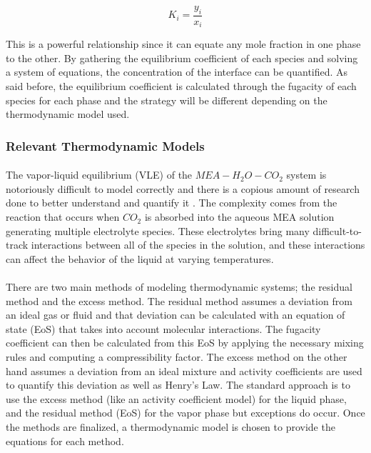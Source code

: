 \documentclass[12pt, letterpaper]{article}
\begin{document}
\begin{equation}
K_i=\frac{y_i}{x_i}
\end{equation}

This is a powerful relationship since it can equate any mole fraction in one phase to the other. By gathering the equilibrium coefficient of each species and solving a system of equations, the concentration of the interface can be quantified.  As said before, the equilibrium coefficient is calculated through the fugacity of each species for each phase and the strategy will be different depending on the thermodynamic model used. 

\subsubsection{Relevant Thermodynamic Models}

\paragraph{}
The vapor-liquid equilibrium (VLE) of the $MEA-H_2O-CO_2$ system is notoriously difficult to model correctly and there is a copious amount of research done to better understand and quantify it \cite{Liu1999}. The complexity comes from the reaction that occurs when $CO_2$ is absorbed into the aqueous MEA solution generating multiple electrolyte species. These electrolytes bring many difficult-to-track interactions between all of the species in the solution, and these interactions can affect the behavior of the liquid at varying temperatures. 

\paragraph{}
There are two main methods of modeling thermodynamic systems; the residual method and the excess method. The residual method assumes a deviation from an ideal gas or fluid and that deviation can be calculated with an equation of state (EoS) that takes into account molecular interactions. The fugacity coefficient can then be calculated from this EoS by applying the necessary mixing rules and computing a compressibility factor. The excess method on the other hand assumes a deviation from an ideal mixture and activity coefficients are used to quantify this deviation as well as Henry's Law. The standard approach is to use the excess method (like an activity coefficient model) for the liquid phase, and the residual method (EoS) for the vapor phase but exceptions do occur. Once the methods are finalized, a thermodynamic model is chosen to provide the equations for each method. 
\end{document}
